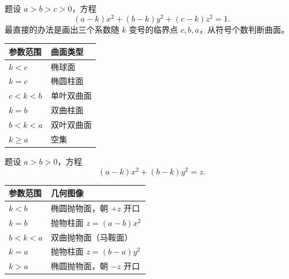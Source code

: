 题设 $a>b>c>0$，方程
\[(a-k)x^2+(b-k)y^2+(c-k)z^2=1.\]
最直接的办法是画出三个系数随 $k$ 变号的临界点 $c,b,a$，从符号个数判断曲面。
\begin{center}\small\begin{tabular}{@{}ll@{}}\toprule
参数范围 & 曲面类型\\\midrule
$k<c$ & 椭球面\\
$k=c$ & 椭圆柱面\\
$c<k<b$ & 单叶双曲面\\
$k=b$ & 双曲柱面\\
$b<k<a$ & 双叶双曲面\\
$k\ge a$ & 空集\\\bottomrule\end{tabular}\end{center}

题设 $a>b>0$，方程
\[(a-k)x^2+(b-k)y^2=z.\]
\begin{center}\small\begin{tabular}{@{}ll@{}}\toprule
参数范围 & 几何图像\\\midrule
$k<b$ & 椭圆抛物面，朝 $+z$ 开口\\
$k=b$ & 抛物柱面 $z=(a-b)x^2$\\
$b<k<a$ & 双曲抛物面（马鞍面）\\
$k=a$ & 抛物柱面 $z=(b-a)y^2$\\
$k>a$ & 椭圆抛物面，朝 $-z$ 开口\\\bottomrule\end{tabular}\end{center}
